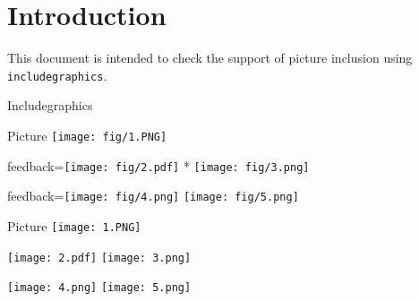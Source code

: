 \documentclass{article}
\begin{document}
\section*{Introduction}

This document is intended to check the support of picture inclusion using 
\texttt{includegraphics}.

\begin{quiz}{Includegraphics}

\begin{multi}{Picture}
\texttt{[image: fig/1.PNG]}
\item[feedback={\texttt{[image: fig/2.pdf]}}]* \texttt{[image: fig/3.png]}
\item[feedback={\texttt{[image: fig/4.png]}}] \texttt{[image: fig/5.png]}
\end{multi}

\graphicspath{{./fig/}}

\begin{matching}[dd]{Picture}
\texttt{[image: 1.PNG]}
\item \texttt{[image: 2.pdf]} \answer \texttt{[image: 3.png]}
\item \texttt{[image: 4.png]} \answer \texttt{[image: 5.png]}
\end{matching}

\end{quiz}
\end{document}

